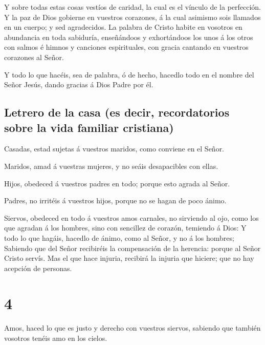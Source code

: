  Y sobre todas estas cosas vestíos de caridad, la cual es
el vínculo de la perfección.  Y la paz de Dios gobierne
en vuestros corazones, á la cual asimismo sois llamados en un cuerpo; y
sed agradecidos.  La palabra de Cristo habite en vosotros
en abundancia en toda sabiduría, enseñándoos y exhortándoos los unos á
los otros con salmos é himnos y canciones espirituales, con gracia
cantando en vuestros corazones al Señor.

 Y todo lo que hacéis, sea de palabra, ó de hecho,
hacedlo todo en el nombre del Señor Jesús, dando gracias á Dios Padre
por él.

\hypertarget{letrero-de-la-casa-es-decir-recordatorios-sobre-la-vida-familiar-cristiana}{%
\subsection{Letrero de la casa (es decir, recordatorios sobre la vida
familiar
cristiana)}\label{letrero-de-la-casa-es-decir-recordatorios-sobre-la-vida-familiar-cristiana}}

 Casadas, estad sujetas á vuestros maridos, como conviene
en el Señor.

 Maridos, amad á vuestras mujeres, y no seáis
desapacibles con ellas.

 Hijos, obedeced á vuestros padres en todo; porque esto
agrada al Señor.

 Padres, no irritéis á vuestros hijos, porque no se hagan
de poco ánimo.

 Siervos, obedeced en todo á vuestros amos carnales, no
sirviendo al ojo, como los que agradan á los hombres, sino con sencillez
de corazón, temiendo á Dios:  Y todo lo que hagáis,
hacedlo de ánimo, como al Señor, y no á los hombres; 
Sabiendo que del Señor recibiréis la compensación de la herencia: porque
al Señor Cristo servís.  Mas el que hace injuria,
recibirá la injuria que hiciere; que no hay acepción de personas.

\hypertarget{section-3}{%
\section{4}\label{section-3}}

 Amos, haced lo que es justo y derecho con vuestros
siervos, sabiendo que también vosotros tenéis amo en los cielos.

